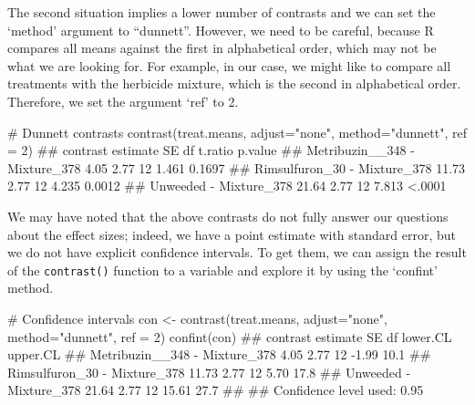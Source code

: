 \documentclass[a4paper,12pt,oneside]{book}
\newenvironment{Shaded}{\begin{snugshade}}{\end{snugshade}}
\newcommand{\DecValTok}[1]{#1}
\newcommand{\StringTok}[1]{#1}
\newcommand{\CommentTok}[1]{#1}
\newcommand{\DocumentationTok}[1]{#1}
\newcommand{\OtherTok}[1]{#1}
\newcommand{\FunctionTok}[1]{#1}
\newcommand{\AttributeTok}[1]{#1}
\newcommand{\NormalTok}[1]{#1}
\begin{document}
\normalsize

The second situation implies a lower number of contrasts and we can set the `method' argument to ``dunnett''. However, we need to be careful, because R compares all means against the first in alphabetical order, which may not be what we are looking for. For example, in our case, we might like to compare all treatments with the herbicide mixture, which is the second in alphabetical order. Therefore, we set the argument `ref' to 2.

\footnotesize

\begin{Shaded}
\begin{Highlighting}[]
\CommentTok{\# Dunnett contrasts}
\FunctionTok{contrast}\NormalTok{(treat.means, }\AttributeTok{adjust=}\StringTok{"none"}\NormalTok{, }\AttributeTok{method=}\StringTok{"dunnett"}\NormalTok{, }\AttributeTok{ref =} \DecValTok{2}\NormalTok{)}
\DocumentationTok{\#\#  contrast                      estimate   SE df t.ratio p.value}
\DocumentationTok{\#\#  Metribuzin\_\_348 {-} Mixture\_378     4.05 2.77 12   1.461  0.1697}
\DocumentationTok{\#\#  Rimsulfuron\_30 {-} Mixture\_378     11.73 2.77 12   4.235  0.0012}
\DocumentationTok{\#\#  Unweeded {-} Mixture\_378           21.64 2.77 12   7.813  \textless{}.0001}
\end{Highlighting}
\end{Shaded}

\normalsize

We may have noted that the above contrasts do not fully answer our questions about the effect sizes; indeed, we have a point estimate with standard error, but we do not have explicit confidence intervals. To get them, we can assign the result of the \texttt{contrast()} function to a variable and explore it by using the `confint' method.

\begin{Shaded}
\begin{Highlighting}[]
\CommentTok{\# Confidence intervals}
\NormalTok{con }\OtherTok{\textless{}{-}} \FunctionTok{contrast}\NormalTok{(treat.means, }\AttributeTok{adjust=}\StringTok{"none"}\NormalTok{, }
                \AttributeTok{method=}\StringTok{"dunnett"}\NormalTok{, }\AttributeTok{ref =} \DecValTok{2}\NormalTok{)}
\FunctionTok{confint}\NormalTok{(con)}
\DocumentationTok{\#\#  contrast                      estimate   SE df lower.CL upper.CL}
\DocumentationTok{\#\#  Metribuzin\_\_348 {-} Mixture\_378     4.05 2.77 12    {-}1.99     10.1}
\DocumentationTok{\#\#  Rimsulfuron\_30 {-} Mixture\_378     11.73 2.77 12     5.70     17.8}
\DocumentationTok{\#\#  Unweeded {-} Mixture\_378           21.64 2.77 12    15.61     27.7}
\DocumentationTok{\#\# }
\DocumentationTok{\#\# Confidence level used: 0.95}
\end{Highlighting}
\end{Shaded}
\end{document}
